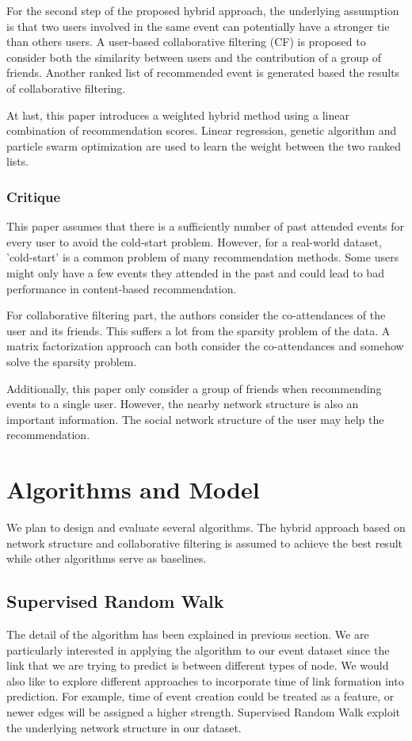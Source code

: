 \documentclass{article}
\begin{document}
For the second step of the proposed hybrid approach, the underlying assumption is that  two users involved in the same event can potentially have a stronger tie than others users. A user-based collaborative filtering (CF) is proposed to consider both the similarity between users and the contribution of a group of friends. Another ranked list of recommended event is generated based the results of collaborative filtering.
	
At last, this paper introduces a weighted hybrid method using a linear combination of recommendation scores. Linear regression, genetic algorithm and particle swarm optimization are used to learn the weight between the two ranked lists.

\subsubsection{Critique}
This paper assumes that there is a sufficiently number of past attended events for every user to avoid the cold-start problem. However, for a real-world dataset, 'cold-start' is a common problem of many recommendation methods. Some users might only have a few events they attended in the past and could lead to bad performance in content-based recommendation. 

For collaborative filtering part, the authors consider the co-attendances of the user and its friends. This suffers a lot from the sparsity problem of the data. A matrix factorization approach can both consider the co-attendances and somehow solve the sparsity problem. 

Additionally, this paper only consider a group of friends when recommending events to a single user. However, the nearby network structure is also an important information. The social network structure of the user may help the recommendation.





\section{Algorithms and Model}
We plan to design and evaluate several algorithms. The hybrid approach based on network structure and collaborative filtering is assumed to achieve the best result while other algorithms serve as baselines.

\subsection{Supervised Random Walk}
The detail of the algorithm has been explained in previous section. We are particularly interested in applying the algorithm to our event dataset since the link that we are trying to predict is between different types of node. We would also like to explore different approaches to incorporate time of link formation into prediction. For example, time of event creation could be treated as a feature, or newer edges will be assigned a higher strength. Supervised Random Walk exploit the underlying network structure in our dataset.
\end{document}
